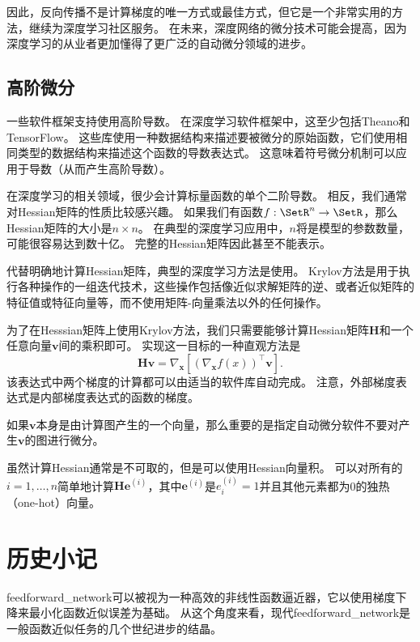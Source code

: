 因此，反向传播不是计算梯度的唯一方式或最佳方式，但它是一个非常实用的方法，继续为深度学习社区服务。 
在未来，深度网络的微分技术可能会提高，因为深度学习的从业者更加懂得了更广泛的自动微分领域的进步。
  
  
\subsection{高阶微分}
\label{sec:higher_order_derivatives}

一些软件框架支持使用高阶导数。 
在深度学习软件框架中，这至少包括Theano和TensorFlow。
这些库使用一种数据结构来描述要被微分的原始函数，它们使用相同类型的数据结构来描述这个函数的导数表达式。
这意味着符号微分机制可以应用于导数（从而产生高阶导数）。

在深度学习的相关领域，很少会计算标量函数的单个二阶导数。
相反，我们通常对Hessian矩阵的性质比较感兴趣。
如果我们有函数$f:\SetR^n \to \SetR$，那么Hessian矩阵的大小是$n\times n$。
在典型的深度学习应用中，$n$将是模型的参数数量，可能很容易达到数十亿。
完整的Hessian矩阵因此甚至不能表示。

代替明确地计算Hessian矩阵，典型的深度学习方法是使用。
Krylov方法是用于执行各种操作的一组迭代技术，这些操作包括像近似求解矩阵的逆、或者近似矩阵的特征值或特征向量等，而不使用矩阵-向量乘法以外的任何操作。

为了在Hesssian矩阵上使用Krylov方法，我们只需要能够计算Hessian矩阵$\bm{H}$和一个任意向量$\bm{v}$间的乘积即可。
实现这一目标的一种直观方法\citep{christianson1992automatic}是
\begin{equation}
  \bm{Hv}=\nabla_{\bm{x}} \left [ (\nabla_{\bm{x}} f(x))^\top \bm{v}\right ].
\end{equation}
该表达式中两个梯度的计算都可以由适当的软件库自动完成。
注意，外部梯度表达式是内部梯度表达式的函数的梯度。

如果$\bm{v}$本身是由计算图产生的一个向量，那么重要的是指定自动微分软件不要对产生$\bm{v}$的图进行微分。

虽然计算Hessian通常是不可取的，但是可以使用Hessian向量积。
可以对所有的$i=1,\ldots,n$简单地计算$\bm{He}^{(i)}$，其中$\bm{e}^{(i)}$是$e_i^{(i)}=1$并且其他元素都为0的独热（one-hot）向量。

\section{历史小记}
\label{sec:historical_notes}

\gls{feedforward_network}可以被视为一种高效的非线性函数逼近器，它以使用梯度下降来最小化函数近似误差为基础。
从这个角度来看，现代\gls{feedforward_network}是一般函数近似任务的几个世纪进步的结晶。
  
